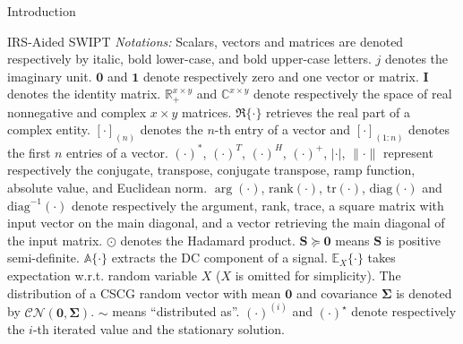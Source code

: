 \documentclass[journal]{IEEEtran}
\begin{document}
\begin{section}{Introduction}
\begin{subsection}{IRS-Aided SWIPT}
			\emph{Notations:} Scalars, vectors and matrices are denoted respectively by italic, bold lower-case, and bold upper-case letters. $j$ denotes the imaginary unit. $\boldsymbol{0}$ and $\boldsymbol{1}$ denote respectively zero and one vector or matrix. $\boldsymbol{I}$ denotes the identity matrix. $\mathbb{R}_+^{x \times y}$ and $\mathbb{C}^{x \times y}$ denote respectively the space of real nonnegative and complex $x \times y$ matrices. $\Re\{\cdot\}$ retrieves the real part of a complex entity. $[\cdot]_{(n)}$ denotes the $n$-th entry of a vector and $[\cdot]_{(1:n)}$ denotes the first $n$ entries of a vector. $(\cdot)^*$, $(\cdot)^T$, $(\cdot)^H$, $(\cdot)^+$, $\lvert{\cdot}\rvert$, $\lVert{\cdot}\rVert$ represent respectively the conjugate, transpose, conjugate transpose, ramp function, absolute value, and Euclidean norm. $\arg(\cdot)$, $\mathrm{rank}(\cdot)$, $\mathrm{tr}(\cdot)$, $\mathrm{diag}(\cdot)$ and $\mathrm{diag}^{-1}(\cdot)$ denote respectively the argument, rank, trace, a square matrix with input vector on the main diagonal, and a vector retrieving the main diagonal of the input matrix. $\odot$ denotes the Hadamard product. $\boldsymbol{S} \succeq \boldsymbol{0}$ means $\boldsymbol{S}$ is positive semi-definite. $\mathbb{A}\{\cdot\}$ extracts the DC component of a signal. $\mathbb{E}_X\{\cdot\}$ takes expectation w.r.t. random variable $X$ ($X$ is omitted for simplicity). The distribution of a CSCG random vector with mean $\boldsymbol{0}$ and covariance $\boldsymbol{\Sigma}$ is denoted by $\mathcal{CN}(\boldsymbol{0},\boldsymbol{\Sigma})$. $\sim$ means ``distributed as''. $(\cdot)^{(i)}$ and $(\cdot)^{\star}$ denote respectively the $i$-th iterated value and the stationary solution.
		\end{subsection}
	\end{section}
\end{document}
